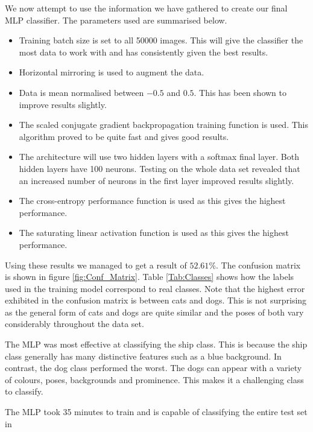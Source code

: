 We now attempt to use the information we have gathered to create our final MLP classifier. The parameters used are summarised below.
\begin{itemize}
    \item Training batch size is set to all 50000 images. This will give the classifier the most data to work with and has consistently given the best results.
    \item Horizontal mirroring is used to augment the data.
    \item Data is mean normalised between $-0.5$ and $0.5$. This has been shown to improve results slightly.
    \item The scaled conjugate gradient backpropagation training function is used. This algorithm proved to be quite fast and gives good results.
    \item The architecture will use two hidden layers with a softmax final layer. Both hidden layers have 100 neurons. Testing on the whole data set revealed that an increased number of neurons in the first layer improved results slightly.
    \item The cross-entropy performance function is used as this gives the highest performance.
    \item The saturating linear activation function is used as this gives the highest performance.
\end{itemize}

Using these results we managed to get a result of $52.61\%$. The confusion matrix is shown in figure \ref{fig:Conf_Matrix}. Table \ref{Tab:Classes} shows how the labels used in the training model correspond to real classes. Note that the highest error exhibited in the confusion matrix is between cats and dogs. This is not surprising as the general form of cats and dogs are quite similar and the poses of both vary considerably throughout the data set.

The MLP was most effective at classifying the ship class. This is because the ship class generally has many distinctive features such as a blue background. In contrast, the dog class performed the worst. The dogs can appear with a variety of colours, poses, backgrounds and prominence. This makes it a challenging class to classify.

The MLP took 35 minutes to train and is capable of classifying the entire test set in

